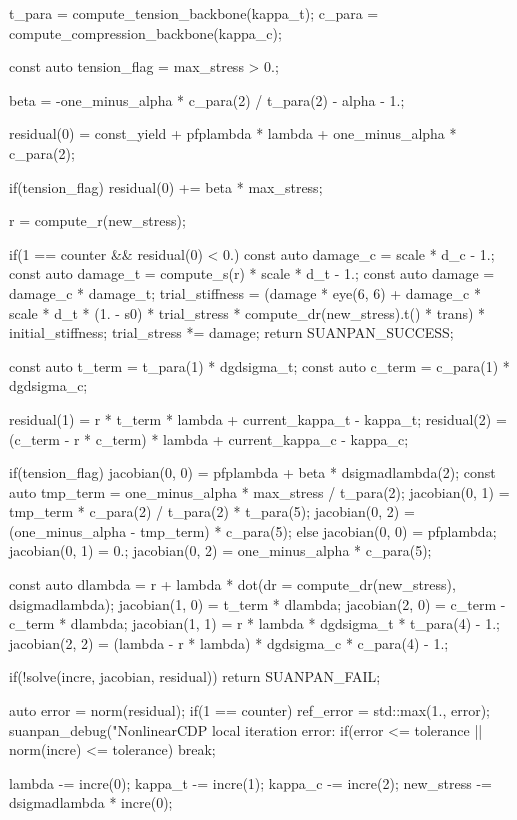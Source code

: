\begin{cppcode}
{{		t_para = compute_tension_backbone(kappa_t);
		c_para = compute_compression_backbone(kappa_c);

		const auto tension_flag = max_stress > 0.;

		beta = -one_minus_alpha * c_para(2) / t_para(2) - alpha - 1.;

		residual(0) = const_yield + pfplambda * lambda + one_minus_alpha * c_para(2);

		if(tension_flag) residual(0) += beta * max_stress;

		r = compute_r(new_stress);

		if(1 == counter && residual(0) < 0.) {
			const auto damage_c = scale * d_c - 1.;
			const auto damage_t = compute_s(r) * scale * d_t - 1.;
			const auto damage = damage_c * damage_t;
			trial_stiffness = (damage * eye(6, 6) + damage_c * scale * d_t * (1. - s0) * trial_stress * compute_dr(new_stress).t() * trans) * initial_stiffness;
			trial_stress *= damage;
			return SUANPAN_SUCCESS;
		}

		const auto t_term = t_para(1) * dgdsigma_t;
		const auto c_term = c_para(1) * dgdsigma_c;

		residual(1) = r * t_term * lambda + current_kappa_t - kappa_t;
		residual(2) = (c_term - r * c_term) * lambda + current_kappa_c - kappa_c;

		if(tension_flag) {
			jacobian(0, 0) = pfplambda + beta * dsigmadlambda(2);
			const auto tmp_term = one_minus_alpha * max_stress / t_para(2);
			jacobian(0, 1) = tmp_term * c_para(2) / t_para(2) * t_para(5);
			jacobian(0, 2) = (one_minus_alpha - tmp_term) * c_para(5);
		}
		else {
			jacobian(0, 0) = pfplambda;
			jacobian(0, 1) = 0.;
			jacobian(0, 2) = one_minus_alpha * c_para(5);
		}

		const auto dlambda = r + lambda * dot(dr = compute_dr(new_stress), dsigmadlambda);
		jacobian(1, 0) = t_term * dlambda;
		jacobian(2, 0) = c_term - c_term * dlambda;
		jacobian(1, 1) = r * lambda * dgdsigma_t * t_para(4) - 1.;
		jacobian(2, 2) = (lambda - r * lambda) * dgdsigma_c * c_para(4) - 1.;

		if(!solve(incre, jacobian, residual)) return SUANPAN_FAIL;

		auto error = norm(residual);
		if(1 == counter) ref_error = std::max(1., error);
		suanpan_debug("NonlinearCDP local iteration error: %
		if(error <= tolerance || norm(incre) <= tolerance) break;

		lambda -= incre(0);
		kappa_t -= incre(1);
		kappa_c -= incre(2);
		new_stress -= dsigmadlambda * incre(0);

}}
\end{cppcode}
